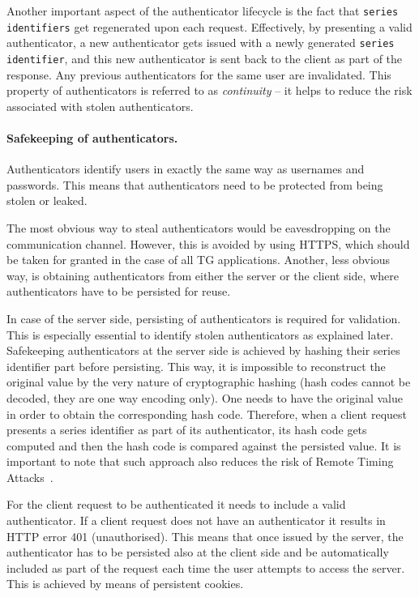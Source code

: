 \documentclass[a4paper,12pt,oneside,openright]{memoir}
\begin{document}
	Another important aspect of the authenticator lifecycle is the fact that \texttt{series identifiers} get regenerated upon each request.
	Effectively, by presenting a valid authenticator, a new authenticator gets issued with a newly generated \texttt{series identifier}, and this new authenticator is sent back to the client as part of the response.
	Any previous authenticators for the same user are invalidated.
	This property of authenticators is referred to as \emph{continuity} -- it helps to reduce the risk associated with stolen authenticators.

	\paragraph{Safekeeping of authenticators.}
	Authenticators identify users in exactly the same way as usernames and passwords.
	This means that authenticators need to be protected from being stolen or leaked.

	The most obvious way to steal authenticators would be eavesdropping on the communication channel.
	However, this is avoided by using HTTPS, which should be taken for granted in the case of all TG applications.
	Another, less obvious way, is obtaining authenticators from either the server or the client side, where authenticators have to be persisted for reuse.

	In case of the server side, persisting of authenticators is required for validation.
	This is especially essential to identify stolen authenticators as explained later.
	Safekeeping authenticators at the server side is achieved by hashing their series identifier part before persisting.
	This way, it is impossible to reconstruct the original value by the very nature of cryptographic hashing (hash codes cannot be decoded, they are one way encoding only).
	One needs to have the original value in order to obtain the corresponding hash code.
	Therefore, when a client request presents a series identifier as part of its authenticator, its hash code gets computed and then the hash code is compared against the persisted value.
	It is important to note that such approach also reduces the risk of Remote Timing Attacks~\cite{RTA}.

	For the client request to be authenticated it needs to include a valid authenticator.
	If a client request does not have an authenticator it results in HTTP error 401 (unauthorised).
	This means that once issued by the server, the authenticator has to be persisted also at the client side and be automatically included as part of the request each time the user attempts to access the server.
	This is achieved by means of persistent cookies.
\end{document}
